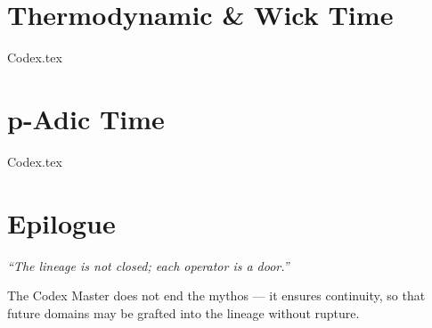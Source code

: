 \documentclass{book}
\begin{document}
\chapter{Thermodynamic \& Wick Time}
{Codex.tex}

\chapter{p-Adic Time}
{Codex.tex}

\chapter*{Epilogue}
\begin{flushright}
\textit{“The lineage is not closed; each operator is a door.”}
\end{flushright}

The Codex Master does not end the mythos — it ensures continuity, 
so that future domains may be grafted into the lineage without rupture.
\end{document}
